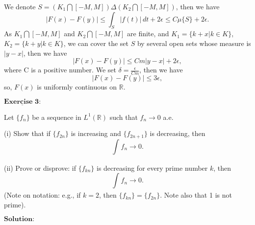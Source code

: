 \documentclass[12pt,a4paper]{ctexart}
\begin{document}
We denote $S = (K_{1} \bigcap [-M, M]) \Delta (K_{2} \bigcap [-M, M])$, then we have
\begin{equation*}
    |F(x) - F(y)|  \leq  \int_{S}^{} |f(t)| \, d t + 2 \epsilon \leq C \mu \{S \} + 2 \epsilon.
\end{equation*}
As $K_{1} \bigcap [-M, M]$ and $K_{2} \bigcap [-M, M]$ are finite, and $K_{1} = \{k + x| k \in K \}$, $K_{2} = \{ k + y| k \in K \}$, we can cover the set $S$ by several open sets whose measure is $|y -x|$, then we have
\begin{equation*}
    |F(x) - F(y)| \leq C m |y - x| + 2 \epsilon,
\end{equation*}
where C is a positive number. We set $\delta = \frac{\epsilon}{Cm}$, then we have
\begin{equation*}
    |F(x) - F(y)| \leq  3 \epsilon,
\end{equation*}
so, $F(x)$ is uniformly continuous on $\mathbb{R}$.

\newpage

$\underline{\textbf{Exercise 3:}}$


Let $\{f_{n}\}$ be a sequence in $L^{1}(\mathbb{R})$ such that $f_{n} \to 0$ a.e.

(i) Show that if $\{f_{2n}\}$ is increasing and $\{f_{2n + 1} \}$ is decreasing, then
\begin{equation*}
    \int_{}^{} f_{n} \to 0.
\end{equation*}

(ii) Prove or disprove: if $\{f_{kn} \}$ is decreasing for every prime number $k$, then 
\begin{equation*}
    \int_{}^{} f_{n} \to 0.
\end{equation*}
(Note on notation: e.g., if $k = 2$, then $\{f_{kn}\} = \{f_{2n}\}$. Note also that 1 is not prime).

\vspace{8pt}
$\textbf{Solution:}$
\end{document}
